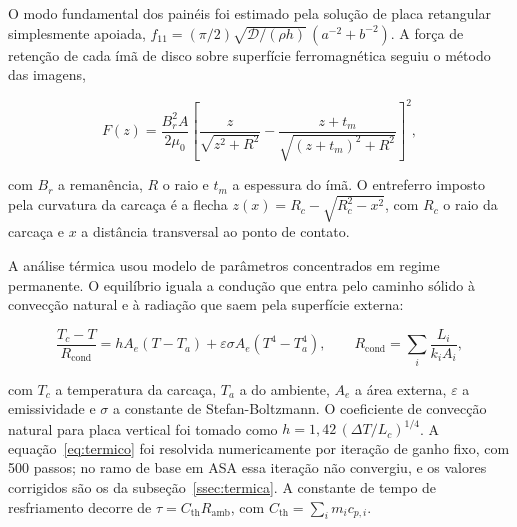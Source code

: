 \documentclass[11pt,a4paper]{article}
\begin{document}
O modo fundamental dos painéis foi estimado pela solução de placa retangular
simplesmente apoiada, $f_{11} = (\pi/2)\sqrt{\mathcal{D}/(\rho h)}\,(a^{-2}+b^{-2})$. A
força de retenção de cada ímã de disco sobre superfície ferromagnética seguiu o método
das imagens,

\begin{equation}
F(z) = \frac{B_r^2 A}{2\mu_0}\left[\frac{z}{\sqrt{z^2+R^2}} - \frac{z+t_m}{\sqrt{(z+t_m)^2+R^2}}\right]^2,
\label{eq:ima}
\end{equation}

\noindent
com $B_r$ a remanência, $R$ o raio e $t_m$ a espessura do ímã. O entreferro imposto pela
curvatura da carcaça é a flecha $z(x) = R_c - \sqrt{R_c^2 - x^2}$, com $R_c$ o raio da
carcaça e $x$ a distância transversal ao ponto de contato.

A análise térmica usou modelo de parâmetros concentrados em regime permanente. O
equilíbrio iguala a condução que entra pelo caminho sólido à convecção natural e à
radiação que saem pela superfície externa:

\begin{equation}
\frac{T_c - T}{R_{\mathrm{cond}}} = h A_e (T - T_a) + \varepsilon \sigma A_e \left(T^4 - T_a^4\right),
\qquad
R_{\mathrm{cond}} = \sum_i \frac{L_i}{k_i A_i},
\label{eq:termico}
\end{equation}

\noindent
com $T_c$ a temperatura da carcaça, $T_a$ a do ambiente, $A_e$ a área externa,
$\varepsilon$ a emissividade e $\sigma$ a constante de Stefan-Boltzmann. O coeficiente de
convecção natural para placa vertical foi tomado como $h = 1{,}42\,(\Delta T/L_c)^{1/4}$.
A equação~\eqref{eq:termico} foi resolvida numericamente por iteração de ganho fixo, com
500 passos; no ramo de base em ASA essa iteração não convergiu, e os valores corrigidos
são os da subseção~\ref{ssec:termica}. A constante de
tempo de resfriamento decorre de $\tau = C_{\mathrm{th}} R_{\mathrm{amb}}$, com
$C_{\mathrm{th}} = \sum_i m_i c_{p,i}$.
\end{document}
